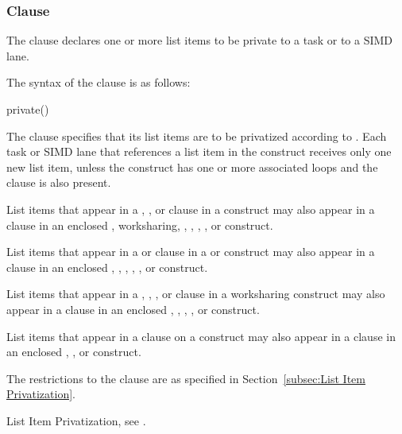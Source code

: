 \subsubsection{ Clause}
\label{subsubsec:private clause}
\summary
The  clause declares one or more list items to be private to a task 
or to a SIMD lane.

\syntax
The syntax of the  clause is as follows:

\begin{ompSyntax}
private()
\end{ompSyntax}

\descr

The  clause specifies that its list items are to be
privatized according to . Each task
or SIMD lane that references a list item in the construct receives only one
new list item, unless the construct has one or more associated loops and the
 clause is also present.

List items that appear in a , , or
 clause in a  construct may also appear
in a  clause in an enclosed , worksharing, 
, , , , or  construct.

List items that appear in a  or  clause 
in a  or  construct may also appear in a 
clause in an enclosed , , , , 
, or  construct.

List items that appear in a , ,
, or  clause in a worksharing
construct may also appear in a  clause in an enclosed
, , , , or  construct.

List items that appear in a  clause on a  construct
may also appear in a  clause in an enclosed , 
, or  construct.

\restrictions
The restrictions to the  clause are as specified in
Section~\ref{subsec:List Item Privatization}.

\begin{crossrefs}
\item List Item Privatization, see .
\end{crossrefs}



